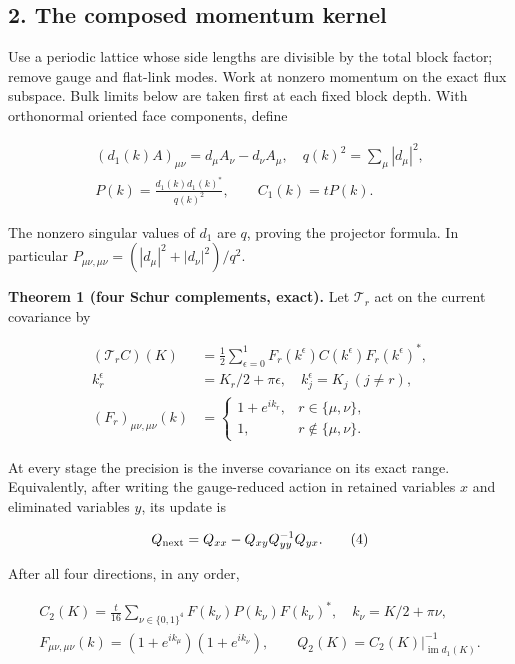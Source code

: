 \documentclass[11pt,a4paper]{article}
\begin{document}
\hypertarget{the-composed-momentum-kernel}{%
\subsection{2. The composed momentum
kernel}\label{the-composed-momentum-kernel}}

Use a periodic lattice whose side lengths are divisible by the total
block factor; remove gauge and flat-link modes. Work at nonzero momentum
on the exact flux subspace. Bulk limits below are taken first at each
fixed block depth. With orthonormal oriented face components, define

\[\begin{gathered}
 (d_1(k)A)_{\mu\nu}=d_\mu A_\nu-d_\nu A_\mu,
 \quad q(k)^2=\sum_\mu|d_\mu|^2,\\
 P(k)=\frac{d_1(k)d_1(k)^*}{q(k)^2},\qquad C_1(k)=tP(k).
\end{gathered}\]

The nonzero singular values of \(d_1\) are \(q\), proving the projector
formula. In particular \(P_{\mu\nu,\mu\nu}=(|d_\mu|^2+|d_\nu|^2)/q^2\).

\textbf{Theorem 1 (four Schur complements, exact).} Let \(\mathcal T_r\)
act on the current covariance by

\[\begin{aligned}
 (\mathcal T_r C)(K)&=\tfrac12\sum_{\epsilon=0}^1
 F_r(k^{\epsilon})C(k^{\epsilon})F_r(k^{\epsilon})^*,\\
 k^{\epsilon}_r&=K_r/2+\pi\epsilon,\quad k^{\epsilon}_j=K_j\ (j\ne r),\\
 (F_r)_{\mu\nu,\mu\nu}(k)&=
 \begin{cases}1+e^{ik_r},&r\in\{\mu,\nu\},\\1,&r\notin\{\mu,\nu\}.
 \end{cases}
\end{aligned}\tag{3}\]

At every stage the precision is the inverse covariance on its exact
range. Equivalently, after writing the gauge-reduced action in retained
variables \(x\) and eliminated variables \(y\), its update is

\[Q_{\rm next}=Q_{xx}-Q_{xy}Q_{yy}^{-1}Q_{yx}. \tag{4}\]

After all four directions, in any order,

\[\boxed{\begin{gathered}
 C_2(K)=\frac t{16}\sum_{\nu\in\{0,1\}^4}
 F(k_\nu)P(k_\nu)F(k_\nu)^*,\quad k_\nu=K/2+\pi\nu,\\
 F_{\mu\nu,\mu\nu}(k)=(1+e^{ik_\mu})(1+e^{ik_\nu}),\qquad
 Q_2(K)=\left.C_2(K)\right|_{\operatorname{im}d_1(K)}^{-1}.
\end{gathered}} \tag{5}\]
\end{document}

